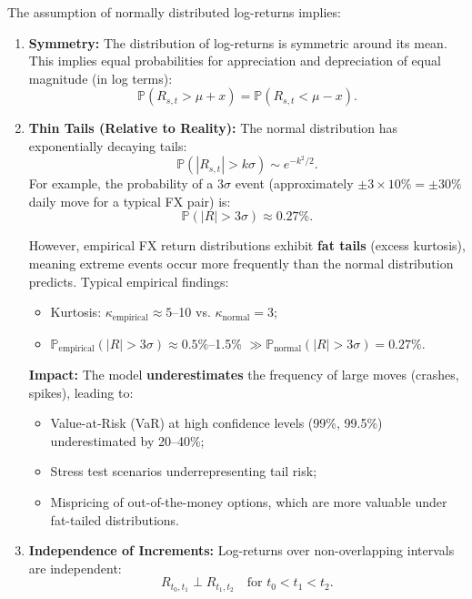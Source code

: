 The assumption of normally distributed log-returns implies:
\begin{enumerate}
	\item \textbf{Symmetry:} The distribution of log-returns is symmetric around its mean. This implies equal probabilities for appreciation and depreciation of equal magnitude (in log terms):
	\begin{equation}
		\mathbb{P}(R_{s,t} > \mu + x) = \mathbb{P}(R_{s,t} < \mu - x).
	\end{equation}
	
	\item \textbf{Thin Tails (Relative to Reality):} The normal distribution has exponentially decaying tails:
	\begin{equation}
		\mathbb{P}(|R_{s,t}| > k\sigma) \sim e^{-k^2/2}.
	\end{equation}
	For example, the probability of a $3\sigma$ event (approximately $\pm 3 \times 10\% = \pm 30\%$ daily move for a typical FX pair) is:
	\begin{equation}
		\mathbb{P}(|R| > 3\sigma) \approx 0.27\%.
	\end{equation}
	
	However, empirical FX return distributions exhibit \textbf{fat tails} (excess kurtosis), meaning extreme events occur more frequently than the normal distribution predicts. Typical empirical findings:
	\begin{itemize}
		\item Kurtosis: $\kappa_{\text{empirical}} \approx 5$--10 vs. $\kappa_{\text{normal}} = 3$;
		\item $\mathbb{P}_{\text{empirical}}(|R| > 3\sigma) \approx 0.5\%$--1.5\% $\gg \mathbb{P}_{\text{normal}}(|R| > 3\sigma) = 0.27\%$.
	\end{itemize}
	
	\textbf{Impact:} The model \textbf{underestimates} the frequency of large moves (crashes, spikes), leading to:
	\begin{itemize}
		\item Value-at-Risk (VaR) at high confidence levels (99\%, 99.5\%) underestimated by 20--40\%;
		\item Stress test scenarios underrepresenting tail risk;
		\item Mispricing of out-of-the-money options, which are more valuable under fat-tailed distributions.
	\end{itemize}
	
	\item \textbf{Independence of Increments:} Log-returns over non-overlapping intervals are independent:
	\begin{equation}
		R_{t_0,t_1} \perp R_{t_1,t_2} \quad \text{for } t_0 < t_1 < t_2.
	\end{equation}
	

\end{enumerate}
